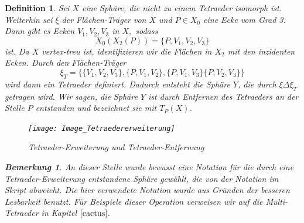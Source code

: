 \documentclass[12pt,titlepage,twoside,cleardoublepage]{article}
\theoremstyle{nummermitklammern}
\newtheorem{definition}[temp]{Definition}
\newtheorem{bemerkung}[temp]{Bemerkung}
\newtheorem{definition}[zahl]{Definition}
\newtheorem{bemerkung}[zahl]{Bemerkung}
\numberwithin{equation}{section}
\begin{document}
\begin{definition}
Sei $X$ eine Sphäre, die nicht zu einem Tetraeder isomorph ist.
Weiterhin sei $\xi$ der Flächen-Träger von $X$ und $P\in X_0$ eine Ecke vom Grad 3. Dann gibt es Ecken $V_1,V_2,V_3$ in $X,$ sodass
\[
X_0(X_2(P))=\{P,V_1,V_2,V_3\}
\] 
ist. Da $X$ vertex-treu ist, identifizieren wir die Flächen in $X_2$  mit den inzidenten Ecken. Durch den Flächen-Träger 
\[
\xi_T=\{\{V_1,V_2,V_3\},\{P,V_1,V_2\},\{P,V_1,V_3\}\{P,V_2,V_3\}\}
\]
 wird dann ein Tetraeder definiert. 
  Dadurch entsteht die Sphäre $Y$, die durch $\xi \Delta \xi_T$ getragen wird. Wir sagen, die Sphäre $Y$ ist durch Entfernen des Tetraeders an der Stelle $P$ entstanden und bezeichnet sie mit $T_P(X)$.
\begin{figure}[H]
\begin{center}
\texttt{[image: Image\_Tetraedererweiterung]}
\end{center}
\caption{Tetraeder-Erweiterung und Tetraeder-Entfernung}
\end{figure}
\begin{bemerkung}
An dieser Stelle wurde bewusst eine Notation für die durch eine Tetraeder-Erweiterung entstandene Sphäre gewählt, die von der Notation im Skript abweicht. Die hier verwendete Notation wurde aus Gründen der besseren Lesbarkeit benutzt. Für Beispiele dieser Operation verweisen wir auf die Multi-Tetraeder in Kapitel $\ref{cactus}$.
\end{bemerkung}
\end{definition}
\end{document}
